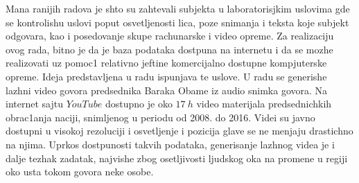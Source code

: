 \documentclass[a4paper, openany, oneside, 11pt]{book}
\begin{document}
Mana ranijih radova je shto su zahtevali subjekta u laboratorisjkim uslovima gde se kontrolishu uslovi poput osvetljenosti lica, poze snimanja i teksta koje subjekt odgovara, kao i posedovanje skupe rachunarske i video opreme. Za realizaciju ovog rada, bitno je da je baza podataka dostpuna na internetu i da se mozhe realizovati uz pomoc1 relativno jeftine komercijalno dostupne kompjuterske opreme. Ideja predstavljena u radu \cite{deepfake2} ispunjava te uslove. U radu se generishe lazhni video govora predsednika Baraka Obame iz audio snimka govora. Na internet sajtu $YouTube$ dostupno je oko $\SI{17}{h}$ video materijala predsednichkih obrac1anja naciji, snimljenog u periodu od 2008. do 2016. Videi su javno dostupni u visokoj rezoluciji i osvetljenje i pozicija glave se ne menjaju drastichno na njima. Uprkos dostpunosti takvih podataka, generisanje lazhnog videa je i dalje tezhak zadatak, najvishe zbog osetljivosti ljudskog oka na promene u regiji oko usta tokom govora neke osobe.\\
\end{document}
